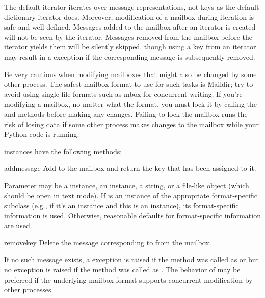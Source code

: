 The default  iterator iterates over message representations, not
keys as the default dictionary iterator does. Moreover, modification of a
mailbox during iteration is safe and well-defined. Messages added to the
mailbox after an iterator is created will not be seen by the iterator. Messages
removed from the mailbox before the iterator yields them will be silently
skipped, though using a key from an iterator may result in a
 exception if the corresponding message is subsequently
removed.

Be very cautious when modifying mailboxes that might also be changed
by some other process.  The safest mailbox format to use for such
tasks is Maildir; try to avoid using single-file formats such as mbox
for concurrent writing.  If you're modifying a mailbox, no matter what
the format, you must lock it by calling the  and
 methods before making any changes.  Failing to lock
the mailbox runs the risk of losing data if some other process makes
changes to the mailbox while your Python code is running.

 instances have the following methods:

\begin{methoddesc}{add}{message}
Add  to the mailbox and return the key that has been assigned to
it.

Parameter  may be a  instance, an
 instance, a string, or a file-like object (which
should be open in text mode). If  is an instance of the
appropriate format-specific  subclass (e.g., if it's an
 instance and this is an  instance), its
format-specific information is used. Otherwise, reasonable defaults for
format-specific information are used.
\end{methoddesc}

\begin{methoddesc}{remove}{key}
Delete the message corresponding to  from the mailbox.

If no such message exists, a  exception is raised if the
method was called as  or  but no
exception is raised if the method was called as . The
behavior of  may be preferred if the underlying mailbox
format supports concurrent modification by other processes.
\end{methoddesc}

